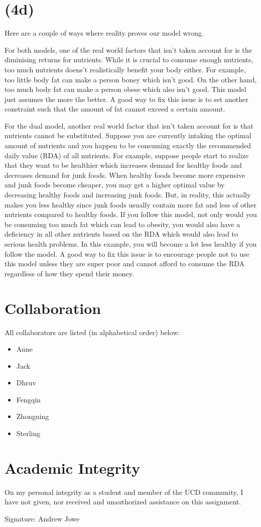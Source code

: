 \documentclass[17pt]{extarticle}
\begin{document}
\section*{(4d)}
Here are a couple of ways where reality proves our model wrong.

\bigskip For both models, one of the real world factors that isn't taken account for is the diminising returns for nutrients. While it is crucial to consume enough nutrients, too much nutrients doens't realistically benefit your body either. For example, too little body fat can make a person boney which isn't good. On the other hand, too much body fat can make a person obese which also isn't good. This model just assumes the more the better. A good way to fix this issue is to set another constraint such that the amount of fat cannot exceed a certain amount.

\bigskip For the dual model, another real world factor that isn't taken account for is that nutrients cannot be substituted. Suppose you are currently intaking the optimal amount of nutrients and you happen to be consuming exactly the recommended daily value (RDA) of all nutrients. For example, suppose people start to realize that they want to be healthier which increases demand for healthy foods and decreases demand for junk foods. When healthy foods become more expensive and junk foods become cheaper, you may get a higher optimal value by decreasing healthy foods and increasing junk foods. But, in reality, this actually makes you less healthy since junk foods usually contain more fat and less of other nutrients compared to healthy foods. If you follow this model, not only would you be consuming too much fat which can lead to obesity, you would also have a deficiency in all other nutrients based on the RDA which would also lead to serious health problems. In this example, you will become a lot less healthy if you follow the model. A good way to fix this issue is to encourage people not to use this model unless they are super poor and cannot afford to consume the RDA regardless of how they spend their money.

\section*{Collaboration}
All collaborators are listed (in alphabetical order) below:
\begin{itemize}
    \item Anne
    \item Jack
    \item Dhruv
    \item Fengqin
    \item Zhongning
    \item Sterling
\end{itemize}

\section*{Academic Integrity}
On my personal integrity as a student and member of the UCD community, I have not given, nor received and unauthorized assistance on this assignment.

Signature: Andrew Jowe
\end{document}
